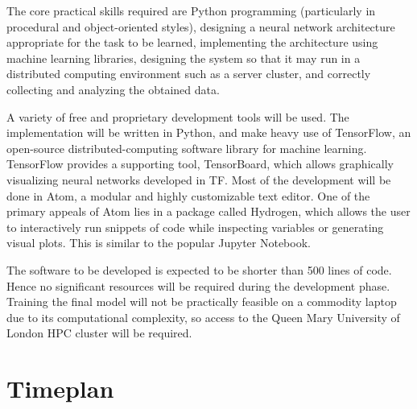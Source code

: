 \documentclass[12pt, titlepage]{article}
\begin{document}
The core practical skills required are Python programming (particularly in
procedural and object-oriented styles), designing a neural network architecture
appropriate for the task to be learned, implementing the architecture using
machine learning libraries, designing the system so that it may run in a
distributed computing environment such as a server cluster, and correctly
collecting and analyzing the obtained data.

A variety of free and proprietary development tools will be used. The
implementation will be written in Python, and make heavy use of TensorFlow,
an open-source distributed-computing software library for machine learning.
TensorFlow provides a supporting tool, TensorBoard, which allows graphically
visualizing neural networks developed in TF. Most of the development will be
done in Atom, a modular and highly customizable text editor. One of the primary
appeals of Atom lies in a package called Hydrogen, which allows the user to
interactively run snippets of code while inspecting variables or generating
visual plots. This is similar to the popular Jupyter Notebook.

The software to be developed is expected to be shorter than 500 lines of code.
Hence no significant resources will be required during the development phase.
Training the final model will not be practically feasible on a commodity laptop
due to its computational complexity, so access to the Queen Mary University of
London HPC cluster will be required.
\clearpage

\section{Timeplan}
\end{document}

